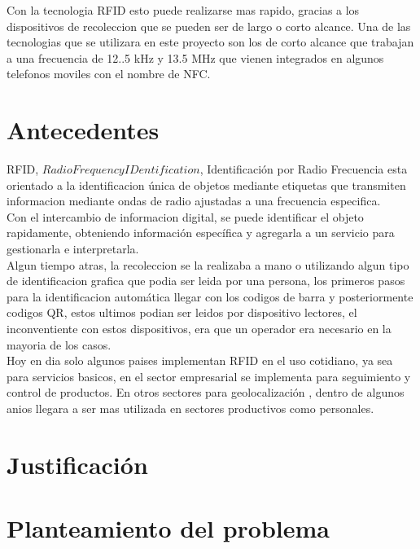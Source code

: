 \documentclass{sig-alternate}
\begin{document}
Con la tecnologia RFID esto puede realizarse mas rapido, gracias a los 
dispositivos de recoleccion que se pueden ser de largo o corto alcance. 
Una de las tecnologias que se utilizara en este proyecto son los de corto 
alcance que trabajan a una frecuencia de 12..5 kHz y 13.5 MHz que vienen 
integrados en algunos telefonos moviles con el nombre de NFC.

\section{Antecedentes}

RFID, \( Radio Frequency IDentification \), Identificaci\'on por Radio Frecuencia esta orientado a la identificacion \'unica de objetos mediante etiquetas que transmiten informacion mediante ondas de radio ajustadas a 
una frecuencia especifica.\\

Con el intercambio de informacion digital, se puede identificar el objeto 
rapidamente, obteniendo informaci\'on espec\'ifica y agregarla a un servicio 
para gestionarla e interpretarla.\\

Algun tiempo atras, la recoleccion se la realizaba a mano o utilizando algun 
tipo de identificacion grafica que podia ser leida por una persona, los 
primeros pasos para la identificacion autom\'atica llegar con los codigos 
de barra y posteriormente codigos QR, estos ultimos podian ser leidos por 
dispositivo lectores, el inconventiente con estos dispositivos, era que 
un operador era necesario en la mayoria de los casos.\\

Hoy en dia solo algunos paises implementan RFID en el uso cotidiano, ya sea 
para servicios basicos, en el sector empresarial se implementa para 
seguimiento y control de productos. En otros sectores para geolocalizaci\'on 
, dentro de algunos anios llegara a ser mas utilizada en sectores 
productivos como personales.\\

\section{Justificaci\'on}




\section{Planteamiento del problema}
\end{document}
